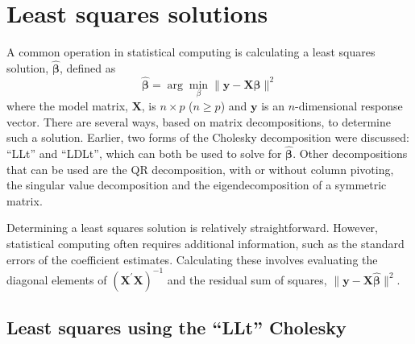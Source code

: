 \documentclass[shortnames,article]{jss}
\begin{document}
\section{Least squares solutions}
\label{sec:leastSquares}

A common operation in statistical computing is calculating a least
squares solution, $\widehat{\bm\beta}$, defined as
\begin{displaymath}
  \widehat{\bm\beta}=\arg\min_{\beta}\|\bm y-\bm X\bm\beta\|^2
\end{displaymath}
where the model matrix, $\bm X$, is $n\times p$ ($n\ge p$) and $\bm y$
is an $n$-dimensional response vector.  There are several ways, based
on matrix decompositions, to determine such a solution.  Earlier, two forms
of the Cholesky decomposition were discussed: ``LLt'' and
``LDLt'', which can both be used to solve for $\widehat{\bm\beta}$.  Other
decompositions that can be used are the QR decomposition, with or
without column pivoting, the singular value decomposition and the
eigendecomposition of a symmetric matrix.

Determining a least squares solution is relatively straightforward.
However, statistical computing often requires additional information,
such as the standard errors of the coefficient estimates.  Calculating
these involves evaluating the diagonal elements of $\left(\bm
  X^\prime\bm X\right)^{-1}$ and the residual sum of squares, $\|\bm
y-\bm X\widehat{\bm\beta}\|^2$.

\subsection{Least squares using the ``LLt'' Cholesky}
\label{sec:LLtLeastSquares}
\end{document}
